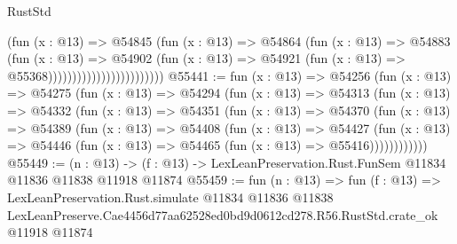 \begin{lexlean}{RustStd}
\begin{coremodule}
                                        (fun (x : @13) =>
                                        @54845
                                          (fun (x : @13) =>
                                          @54864
                                            (fun (x : @13) =>
                                            @54883
                                              (fun (x : @13) =>
                                              @54902
                                                (fun (x : @13) =>
                                                @54921
                                                  (fun (x : @13) => @55368))))))))))))))))))))))))
@55441 := fun (x : @13) =>
  @54256
    (fun (x : @13) =>
    @54275
      (fun (x : @13) =>
      @54294
        (fun (x : @13) =>
        @54313
          (fun (x : @13) =>
          @54332
            (fun (x : @13) =>
            @54351
              (fun (x : @13) =>
              @54370
                (fun (x : @13) =>
                @54389
                  (fun (x : @13) =>
                  @54408
                    (fun (x : @13) =>
                    @54427
                      (fun (x : @13) =>
                      @54446 (fun (x : @13) => @54465 (fun (x : @13) => @55416))))))))))))
@55449 := (n : @13) ->
  (f : @13) -> LexLeanPreservation.Rust.FunSem @11834 @11836 @11838 @11918 @11874
@55459 := fun (n : @13) =>
  fun (f : @13) =>
  LexLeanPreservation.Rust.simulate
    @11834
    @11836
    @11838
    LexLeanPreserve.Cae4456d77aa62528ed0bd9d0612cd278.R56.RustStd.crate_ok
    @11918
    @11874
\end{coremodule}
\end{lexlean}
